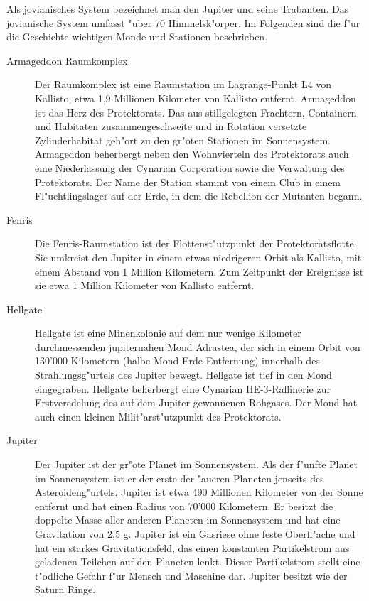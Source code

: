 
Als jovianisches System bezeichnet man den Jupiter und seine Trabanten. Das jovianische System umfasst "uber 70 Himmelsk"orper. Im Folgenden sind die f"ur die Geschichte wichtigen Monde und Stationen beschrieben.

\begin{description}
\item [Armageddon Raumkomplex] Der Raumkomplex ist eine Raumstation im Lagrange-Punkt L4 von Kallisto, etwa 1,9 Millionen Kilometer von 
      Kallisto entfernt. Armageddon ist das Herz des Protektorats. Das aus stillgelegten Frachtern, Containern und Habitaten zusammengeschwei\3te und in Rotation versetzte Zylinderhabitat geh"ort zu den gr"o\3ten Stationen im Sonnensystem. Armageddon beherbergt neben den Wohnvierteln des Protektorats auch eine Niederlassung der Cynarian Corporation sowie die Verwaltung des Protektorats. Der Name der Station stammt von einem Club in einem Fl"uchtlingslager auf der Erde, in dem die Rebellion der Mutanten begann.
\item [Fenris] Die Fenris-Raumstation ist der Flottenst"utzpunkt der Protektoratsflotte. Sie umkreist den Jupiter in einem etwas niedrigeren 
      Orbit als Kallisto, mit einem Abstand von 1 Million Kilometern. Zum Zeitpunkt der Ereignisse ist sie etwa 1 Million Kilometer von Kallisto entfernt.
\item [Hellgate] Hellgate ist eine Minenkolonie auf dem nur wenige Kilometer durchmessenden jupiternahen Mond Adrastea, der sich in einem 
      Orbit von 130'000 Kilometern (halbe Mond-Erde-Entfernung) innerhalb des Strahlungsg"urtels des Jupiter bewegt. Hellgate ist tief in den Mond eingegraben. Hellgate beherbergt eine Cynarian HE-3-Raffinerie zur Erstveredelung des auf dem Jupiter gewonnenen Rohgases. Der Mond hat auch einen kleinen Milit"arst"utzpunkt des Protektorats.
\item [Jupiter] Der Jupiter ist der gr"o\3te Planet im Sonnensystem. Als der f"unfte Planet im Sonnensystem ist er der erste der "au\3eren 
      Planeten jenseits des Asteroideng"urtels. Jupiter ist etwa 490 Millionen Kilometer von der Sonne entfernt und hat einen Radius von 70'000 Kilometern. Er besitzt die doppelte Masse aller anderen Planeten im Sonnensystem und hat eine Gravitation von 2,5 g. Jupiter ist ein Gasriese ohne feste Oberfl"ache und hat ein starkes Gravitationsfeld, das einen konstanten Partikelstrom aus geladenen Teilchen auf den Planeten lenkt. Dieser Partikelstrom stellt eine t"odliche Gefahr f"ur Mensch und Maschine dar. Jupiter besitzt wie der Saturn Ringe.

\end{description}

